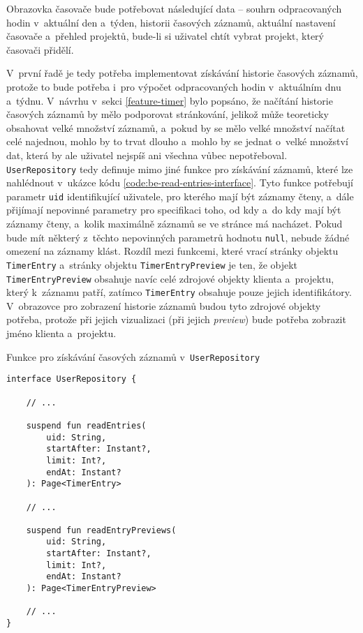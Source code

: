 Obrazovka časovače bude potřebovat následující data – souhrn odpracovaných hodin v~aktuální den a~týden, historii časových záznamů, aktuální nastavení časovače a~přehled projektů, bude-li si uživatel chtít vybrat projekt, který časovači přidělí.

V~první řadě je tedy potřeba implementovat získávání historie časových záznamů, protože to bude potřeba i~pro výpočet odpracovaných hodin v~aktuálním dnu a~týdnu. V~návrhu v~sekci \ref{feature-timer} bylo popsáno, že načítání historie časových záznamů by mělo podporovat stránkování, jelikož může teoreticky obsahovat velké množství záznamů, a~pokud by se mělo velké množství načítat celé najednou, mohlo by to trvat dlouho a~mohlo by se jednat o~velké množství dat, která by ale uživatel nejspíš ani všechna vůbec nepotřeboval. \texttt{UserRepository} tedy definuje mimo jiné funkce pro získávání záznamů, které lze nahlédnout v~ukázce kódu \ref{code:be-read-entries-interface}. Tyto funkce potřebují parametr \texttt{uid} identifikující uživatele, pro kterého mají být záznamy čteny, a~dále přijímají nepovinné parametry pro specifikaci toho, od kdy a~do kdy mají být záznamy čteny, a~kolik maximálně záznamů se ve stránce má nacházet. Pokud bude mít některý z~těchto nepovinných parametrů hodnotu \texttt{null}, nebude žádné omezení na záznamy klást. Rozdíl mezi funkcemi, které vrací stránky objektu \texttt{TimerEntry} a~stránky objektu \texttt{TimerEntryPreview} je ten, že objekt \texttt{TimerEntryPreview} obsahuje navíc celé zdrojové objekty klienta a~projektu, který k~záznamu patří, zatímco \texttt{TimerEntry} obsahuje pouze jejich identifikátory. V~obrazovce pro zobrazení historie záznamů budou tyto zdrojové objekty potřeba, protože při jejich vizualizaci (při jejich \emph{preview}) bude potřeba zobrazit jméno klienta a~projektu.

\begin{listing}
\caption{Funkce pro získávání časových záznamů v~\texttt{UserRepository}}\label{code:be-read-entries-interface}
\begin{verbatim}
interface UserRepository {

    // ...
    
    suspend fun readEntries(
        uid: String,
        startAfter: Instant?,
        limit: Int?,
        endAt: Instant?
    ): Page<TimerEntry>
    
    // ...
    
    suspend fun readEntryPreviews(
        uid: String,
        startAfter: Instant?,
        limit: Int?,
        endAt: Instant?
    ): Page<TimerEntryPreview>
    
    // ...
}
\end{verbatim}
\end{listing}

